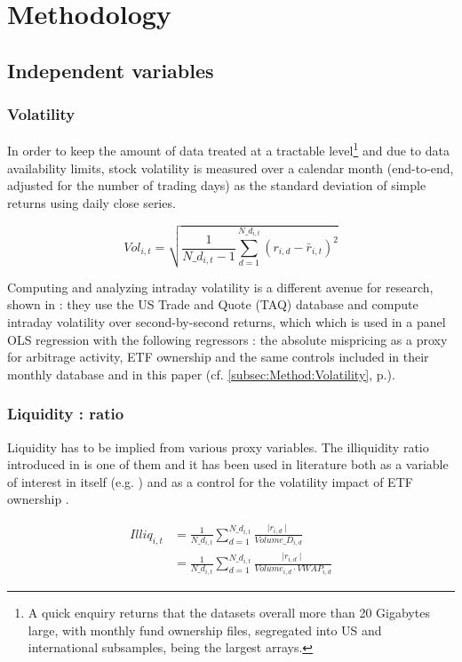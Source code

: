 \section{Methodology}
\subsection{Independent variables}
\subsubsection{Volatility}
In order to keep the amount of data treated at a tractable level\footnote{A quick enquiry returns that the datasets overall more than 20 Gigabytes large, with monthly fund ownership files, segregated into US and international subsamples, being the largest arrays.} and due to data availability limits, stock volatility is measured over a calendar month (end-to-end, adjusted for the number of trading days) as the standard deviation of simple returns using daily close series.

\begin{equation}
  Vol_{i, t} = \sqrt{\frac{1}{N\_d_{i, t} - 1} \sum_{d = 1}^{N\_d_{i, t}} (r_{i, d} - \bar{r}_{i, t})^2}
  \end{equation}

Computing and analyzing intraday volatility is a different avenue for research, shown in \cite{Ben-David2018} : they use the US Trade and Quote (TAQ) database and compute intraday volatility over second-by-second returns, which which is used in a panel OLS regression with the following regressors : the absolute mispricing as a proxy for arbitrage activity, ETF ownership and the same controls included in their monthly database and in this paper (cf. \autoref{subsec:Method:Volatility}, p.\pageref{subsec:Method:Volatility}).
\subsubsection{Liquidity : \cite{Amihud2002} ratio}
Liquidity has to be implied from various proxy variables. The illiquidity ratio introduced in \cite{Amihud2002} is one of them and it has been used in literature both as a variable of interest in itself (e.g. \cite{Israeli2017}) and as a control for the volatility impact of ETF ownership \parencite{Ben-David2018}.

\begin{equation}
  \begin{split}
    Illiq_{i, t} & = \frac{1}{N\_d_{i, t}} \sum_{d = 1}^{N\_d_{i, t}} \frac{\mid r_{i, d} \mid}{Volume\_D_{i, d}}\\
    &  = \frac{1}{N\_d_{i, t}} \sum_{d = 1}^{N\_d_{i, t}} \frac{\mid r_{i, d} \mid}{Volume_{i, d} \cdot VWAP_{i, d}}
    \end{split}
\end{equation}

